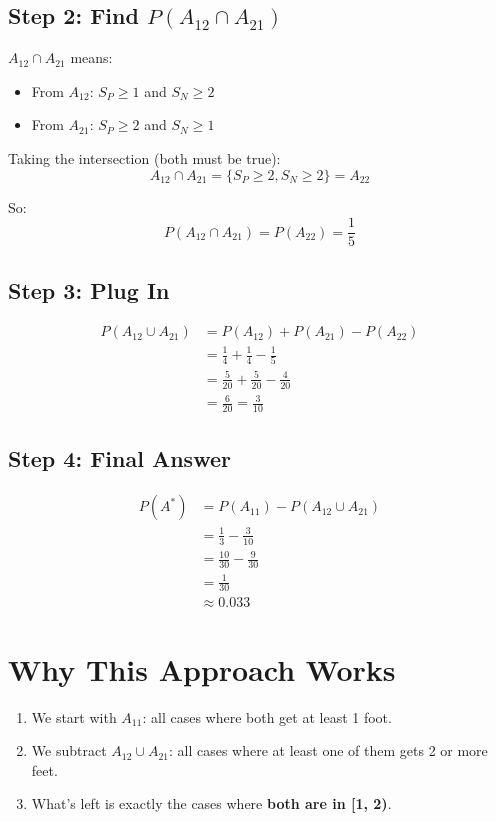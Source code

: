 \documentclass[11pt]{article}
\begin{document}
\subsection*{Step 2: Find $P(A_{12} \cap A_{21})$}

$A_{12} \cap A_{21}$ means:
\begin{itemize}
    \item From $A_{12}$: $S_P \geq 1$ and $S_N \geq 2$
    \item From $A_{21}$: $S_P \geq 2$ and $S_N \geq 1$
\end{itemize}

Taking the intersection (both must be true):
\[
A_{12} \cap A_{21} = \{S_P \geq 2, S_N \geq 2\} = A_{22}
\]

So:
\[
P(A_{12} \cap A_{21}) = P(A_{22}) = \frac{1}{5}
\]

\subsection*{Step 3: Plug In}

\begin{align*}
P(A_{12} \cup A_{21}) &= P(A_{12}) + P(A_{21}) - P(A_{22}) \\
&= \frac{1}{4} + \frac{1}{4} - \frac{1}{5} \\
&= \frac{5}{20} + \frac{5}{20} - \frac{4}{20} \\
&= \frac{6}{20} = \frac{3}{10}
\end{align*}

\subsection*{Step 4: Final Answer}

\begin{align*}
P(A^*) &= P(A_{11}) - P(A_{12} \cup A_{21}) \\
&= \frac{1}{3} - \frac{3}{10} \\
&= \frac{10}{30} - \frac{9}{30} \\
&= \frac{1}{30} \\
&\approx 0.033
\end{align*}

\section*{Why This Approach Works}

\begin{enumerate}
    \item We start with $A_{11}$: all cases where both get at least 1 foot.

    \item We subtract $A_{12} \cup A_{21}$: all cases where at least one of them gets 2 or more feet.

    \item What's left is exactly the cases where \textbf{both are in [1, 2)}.
\end{enumerate}
\end{document}
